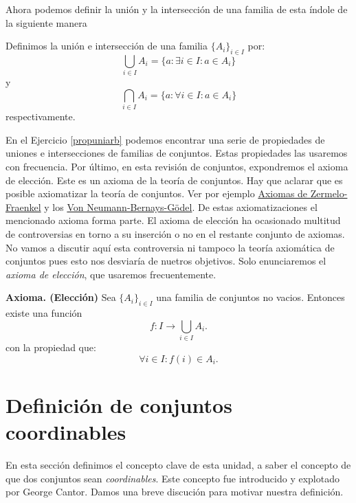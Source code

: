 Ahora podemos definir la unión y la intersección de una
familia de esta índole de la siguiente manera
\begin{definicion}{}  Definimos la unión e intersección de una
familia $\{A_i\}_{i\in I}$ por:
\[\bigcup_{i\in I}A_i=\{a:\exists i\in I:a\in A_i\}\]
y
\[\bigcap_{i\in I}A_i=\{a:\forall i\in I:a\in A_i\}\]
respectivamente.
\end{definicion}
En el Ejercicio \vref{propuniarb} podemos encontrar una serie de
propiedades de uniones e intersecciones de familias de conjuntos.
Estas propiedades las usaremos con frecuencia.
 Por último, en esta revisión de conjuntos, expondremos el
 axioma de elección. Este es un axioma de la teoría de
 conjuntos. Hay que aclarar que es posible axiomatizar la
 teoría de conjuntos. Ver por ejemplo \href{https://es.wikipedia.org/wiki/Axiomas_de_Zermelo-Fraenkel}{Axiomas de Zermelo-Fraenkel} y los \href{https://es.wikipedia.org/wiki/Teoría_de_conjuntos_de_Von_Neumann-Bernays-Gödel}{Von Neumann-Bernays-G\"odel}.  De estas axiomatizaciones el mencionado axioma
 forma parte. El axioma de elección  ha ocasionado multitud de controversias en torno a su  inserción o no en el restante conjunto de axiomas. No vamos a
 discutir aquí esta controversia ni tampoco la teoría
 axiomática de conjuntos pues esto nos desviaría de nuetros
 objetivos. Solo enunciaremos el \emph{axioma de elección}, que
 usaremos frecuentemente.

 

\begin{mdframed}[style=MiEstilo]\relax%
 \textbf{Axioma. (Elección)}  Sea $\{A_i\}_{i\in I}$ una familia de conjuntos no
vacios. Entonces existe una función
\[f:I\longrightarrow\bigcup_{i\in I}A_i.\]
con la propiedad  que: 
\[\forall i\in I: f(i)\in A_i.\]
\end{mdframed}







\section{Definición de conjuntos coordinables}
En esta sección definimos el concepto clave de esta unidad, a
saber el concepto de que dos conjuntos sean \emph{coordinables}. Este concepto fue introducido y explotado por George Cantor.  Damos
una breve discución para motivar nuestra definición.

